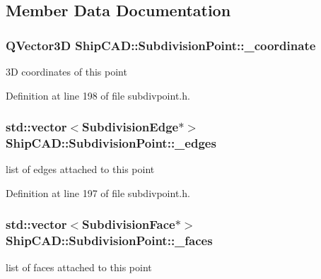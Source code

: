 \subsection{Member Data Documentation}
\hypertarget{classShipCAD_1_1SubdivisionPoint_a42bb8f729c7d79e594bda17f92ddb26b}{
\subsubsection[{\-\_\-coordinate}]{\setlength{\rightskip}{0pt plus 5cm}Q\-Vector3\-D Ship\-C\-A\-D\-::\-Subdivision\-Point\-::\-\_\-coordinate\hspace{0.3cm}{\ttfamily [protected]}}}\label{classShipCAD_1_1SubdivisionPoint_a42bb8f729c7d79e594bda17f92ddb26b}
3\-D coordinates of this point 

Definition at line 198 of file subdivpoint.\-h.

\hypertarget{classShipCAD_1_1SubdivisionPoint_a17c5a46dc6c130259e96f49719ef3ee9}{
\subsubsection[{\-\_\-edges}]{\setlength{\rightskip}{0pt plus 5cm}std\-::vector$<${\bf Subdivision\-Edge}$\ast$$>$ Ship\-C\-A\-D\-::\-Subdivision\-Point\-::\-\_\-edges\hspace{0.3cm}{\ttfamily [protected]}}}\label{classShipCAD_1_1SubdivisionPoint_a17c5a46dc6c130259e96f49719ef3ee9}
list of edges attached to this point 

Definition at line 197 of file subdivpoint.\-h.

\hypertarget{classShipCAD_1_1SubdivisionPoint_ace13688b5e2ad09c8d3f37cc0eaaaa52}{
\subsubsection[{\-\_\-faces}]{\setlength{\rightskip}{0pt plus 5cm}std\-::vector$<${\bf Subdivision\-Face}$\ast$$>$ Ship\-C\-A\-D\-::\-Subdivision\-Point\-::\-\_\-faces\hspace{0.3cm}{\ttfamily [protected]}}}\label{classShipCAD_1_1SubdivisionPoint_ace13688b5e2ad09c8d3f37cc0eaaaa52}
list of faces attached to this point 

